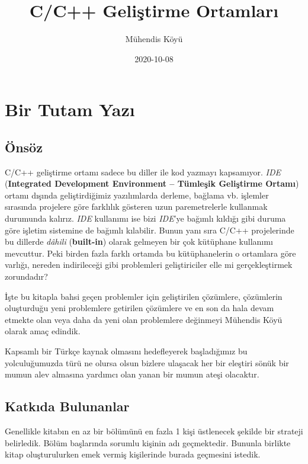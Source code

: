 \documentclass[
]{book}
\title{C/C++ Geliştirme Ortamları}
\author{Mühendis Köyü}
\date{2020-10-08}
\begin{document}
\maketitle

{
\setcounter{tocdepth}{1}
\tableofcontents
}
\hypertarget{bir-tutam-yazux131}{%
\chapter*{Bir Tutam Yazı}\label{bir-tutam-yazux131}}

\hypertarget{uxf6nsuxf6z}{%
\section*{Önsöz}\label{uxf6nsuxf6z}}

C/C++ geliştirme ortamı sadece bu diller ile kod yazmayı kapsamıyor. \emph{IDE} (\textbf{Integrated Development Environment -- Tümleşik Geliştirme Ortamı}) ortamı dışında geliştirdiğimiz yazılımlarda derleme, bağlama vb. işlemler sırasında projelere göre farklılık gösteren uzun paremetrelerle kullanmak durumunda kalırız. \emph{IDE} kullanımı ise bizi \emph{IDE}'ye bağımlı kıldığı gibi duruma göre işletim sistemine de bağımlı kılabilir. Bunun yanı sıra C/C++ projelerinde bu dillerde \emph{dâhili} (\textbf{built-in}) olarak gelmeyen bir çok kütüphane kullanımı mevcuttur. Peki birden fazla farklı ortamda bu kütüphanelerin o ortamlara göre varlığı, nereden indirileceği gibi problemleri geliştiriciler elle mi gerçekleştirmek zorundadır?

İşte bu kitapla bahsi geçen problemler için geliştirilen çözümlere, çözümlerin oluşturduğu yeni problemlere getirilen çözümlere ve en son da hala devam etmekte olan veya daha da yeni olan problemlere değinmeyi Mühendis Köyü olarak amaç edindik.

Kapsamlı bir Türkçe kaynak olmasını hedefleyerek başladığımız bu yolculuğumuzda türü ne olursa olsun bizlere ulaşacak her bir eleştiri sönük bir mumun alev almasına yardımcı olan yanan bir mumun ateşi olacaktır.

\hypertarget{katkux131da-bulunanlar}{%
\section*{Katkıda Bulunanlar}\label{katkux131da-bulunanlar}}

Genellikle kitabın en az bir bölümünü en fazla 1 kişi üstlenecek şekilde bir strateji belirledik. Bölüm başlarında sorumlu kişinin adı geçmektedir. Bununla birlikte kitap oluşturulurken emek vermiş kişilerinde burada geçmesini istedik.
\end{document}
